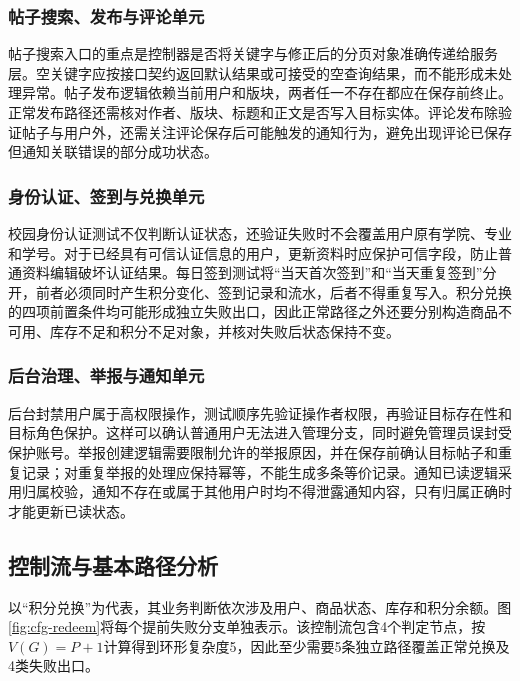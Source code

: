 \documentclass[bwprint]{report}
\begin{document}
\subsubsection{帖子搜索、发布与评论单元}
帖子搜索入口的重点是控制器是否将关键字与修正后的分页对象准确传递给服务层。空关键字应按接口契约返回默认结果或可接受的空查询结果，而不能形成未处理异常。帖子发布逻辑依赖当前用户和版块，两者任一不存在都应在保存前终止。正常发布路径还需核对作者、版块、标题和正文是否写入目标实体。评论发布除验证帖子与用户外，还需关注评论保存后可能触发的通知行为，避免出现评论已保存但通知关联错误的部分成功状态。

\subsubsection{身份认证、签到与兑换单元}
校园身份认证测试不仅判断认证状态，还验证失败时不会覆盖用户原有学院、专业和学号。对于已经具有可信认证信息的用户，更新资料时应保护可信字段，防止普通资料编辑破坏认证结果。每日签到测试将“当天首次签到”和“当天重复签到”分开，前者必须同时产生积分变化、签到记录和流水，后者不得重复写入。积分兑换的四项前置条件均可能形成独立失败出口，因此正常路径之外还要分别构造商品不可用、库存不足和积分不足对象，并核对失败后状态保持不变。

\subsubsection{后台治理、举报与通知单元}
后台封禁用户属于高权限操作，测试顺序先验证操作者权限，再验证目标存在性和目标角色保护。这样可以确认普通用户无法进入管理分支，同时避免管理员误封受保护账号。举报创建逻辑需要限制允许的举报原因，并在保存前确认目标帖子和重复记录；对重复举报的处理应保持幂等，不能生成多条等价记录。通知已读逻辑采用归属校验，通知不存在或属于其他用户时均不得泄露通知内容，只有归属正确时才能更新已读状态。

\subsection{控制流与基本路径分析}
以“积分兑换”为代表，其业务判断依次涉及用户、商品状态、库存和积分余额。图\ref{fig:cfg-redeem}将每个提前失败分支单独表示。该控制流包含4个判定节点，按$V(G)=P+1$计算得到环形复杂度5，因此至少需要5条独立路径覆盖正常兑换及4类失败出口。
\end{document}
